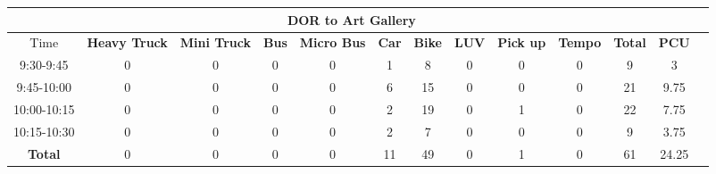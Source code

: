 \begin{landscape}
\begin{table}[h!]
\begin{tabular}{|c|c|c|c|c|c|c|c|c|c|c|c|c|}
    \hline
    \multicolumn{12}{|c|}{\textbf{DOR to Art Gallery}} \\
    \hline
        Time & \textbf{Heavy Truck} & \textbf{Mini Truck} & \textbf{Bus} & \textbf{Micro Bus} & \textbf{Car} & \textbf{Bike} & \textbf{LUV} & \textbf{Pick up} & \textbf{Tempo} & \textbf{\textbf{Total}} & \textbf{PCU} \\
    \hline
9:30-9:45	&0	&0	&0	&0	&1	&8	&0	&0	&0	&9	&3 \\ \hline
9:45-10:00	&0	&0	&0	&0	&6	&15	&0	&0	&0	&21	&9.75 \\ \hline
10:00-10:15	&0	&0	&0	&0	&2	&19	&0	&1	&0	&22	&7.75 \\ \hline
10:15-10:30	&0	&0	&0	&0	&2	&7	&0	&0	&0	&9	&3.75 \\ \hline
\textbf{Total}	&0	&0	&0	&0	&11	&49	&0	&1	&0	&61	&24.25 \\ \hline

\end{tabular}

\end{table}
\end{landscape}


